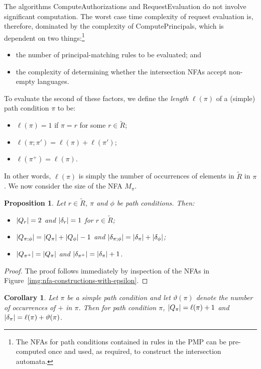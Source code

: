 \documentclass{article}
\newtheorem{corollary}{Corollary}
\newtheorem{proposition}{Proposition}
\newcommand{\RcoR}{\ensuremath{\widetilde{R}}} \newcommand{\entity}[1]{\ensuremath{#1}} \newcommand{\rel}[1]{\ensuremath{#1}} \newcommand{\relw}[1]{\textsf{#1}} \newcommand{\comp}{\mathbin{;}} \newcommand{\relpc}[1]{\textsf{#1}} \newcommand{\princ}[1]{\textsf{#1}} \newcommand{\ppmc}{\ensuremath{\phi}} \newcommand{\npmc}{\ensuremath{\psi}} \newcommand{\pmp}{\ensuremath{\rho}} \newcommand{\act}[1]{\textsf{#1}} \newcommand{\crs}{\ensuremath{\chi}} \newcommand{\crso}[1]{\textsf{#1}} \newcommand{\defo}[1]{#1} \newcommand{\mpalg}{\textsf{MatchPrincipal}\xspace} \renewcommand{\algorithmiccomment}[1]{// #1} \newcommand{\audita}[1]{\ensuremath{#1^\oplus}}
\begin{document}
The algorithms \textsf{ComputeAuthorizations} and \textsf{RequestEvaluation} do not involve significant computation.
The worst case time complexity of request evaluation is, therefore, dominated by the complexity of \textsf{ComputePrincipals}, which is dependent on two things:\footnote{The NFAs for path conditions contained in rules in the PMP can be pre-computed once and used, as required, to construct the intersection automata.}
\begin{itemize}
    \item the number of principal-matching rules to be evaluated; and
    \item the complexity of determining whether the intersection NFAs accept non-empty languages.
\end{itemize}
To evaluate the second of these factors, we define the \emph{length} $\ell(\pi)$ of a (simple) path condition $\pi$ to be:
    \begin{itemize}
        \item  $\ell(\pi) = 1$ if $\pi = r$ for some $r \in \RcoR$; \item  $\ell(\pi \comp \pi') = \ell(\pi) + \ell(\pi')$;
        \item  $\ell(\pi^+) = \ell(\pi)$.
    \end{itemize}
In other words, $\ell(\pi)$ is simply the number of occurrences of elements in $\RcoR$ in $\pi$.
We now consider the size of the NFA $M_\pi$.

\begin{proposition}
Let $r \in \RcoR$, $\pi$ and $\phi$ be path conditions.  Then:
 \begin{itemize}
  \item $\left| Q_r \right| = 2$ and $\left| \delta_r \right| = 1$ for $r \in \RcoR$;
  \item $\card{Q_{\pi \comp \phi}} = \card{Q_{\pi}} + \card{Q_{\phi}} - 1$ and $\card{\delta_{\pi \comp \phi}} = \card{\delta_{\pi}} + \card{\delta_{\phi}}$;
  \item $\left| Q_{\pi^+} \right| = \left| Q_\pi \right|$ and $\left| \delta_{\pi^+} \right| = \left| \delta_{\pi} \right| + 1$.
 \end{itemize}
\end{proposition}

\begin{proof}
 The proof follows immediately by inspection of the NFAs in Figure~\ref{img:nfa-constructions-with-epsilon}.
\end{proof}

\begin{corollary}
 Let $\pi$ be a simple path condition and let $\vartheta(\pi)$ denote the number of occurrences of $+$ in $\pi$.
 Then for path condition $\pi$, $\left| Q_\pi \right| = \ell(\pi) + 1$ and $\left| \delta_\pi \right| = \ell(\pi) + \vartheta(\pi)$.
\end{corollary}
\end{document}
